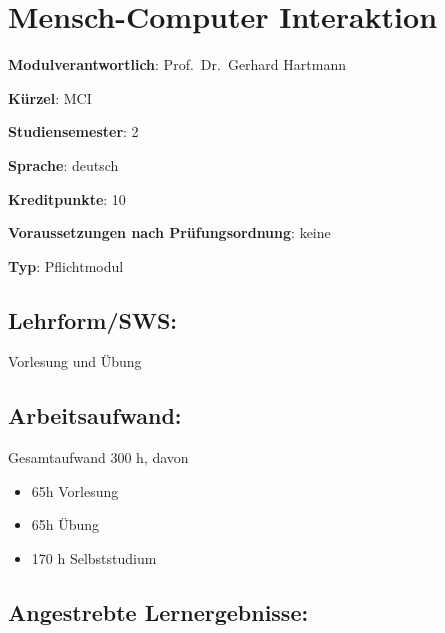 \chapter{Mensch-Computer Interaktion}\label{mensch-computer-interaktion}

\begin{modulHead}
\textbf{Modulverantwortlich}: Prof.~Dr.~Gerhard
Hartmann
\end{modulHead}
\begin{modulHead}
\textbf{Kürzel}:
MCI
\end{modulHead}
\begin{modulHead}
\textbf{Studiensemester}:
2
\end{modulHead}
\begin{modulHead}
\textbf{Sprache}:
deutsch
\end{modulHead}
\begin{modulHead}
\textbf{Kreditpunkte}:
10
\end{modulHead}
\begin{modulHead}
\textbf{Voraussetzungen nach
Prüfungsordnung}: keine
\end{modulHead}
\begin{modulHead}
\textbf{Typ}:
Pflichtmodul
\end{modulHead}


\section*{Lehrform/SWS:}\label{lehrformsws-15}

Vorlesung und Übung

\section*{Arbeitsaufwand:}\label{arbeitsaufwand-14}

Gesamtaufwand 300 h, davon

\begin{itemize}
\tightlist
\item
  65h Vorlesung
\item
  65h Übung
\item
  170 h Selbststudium
\end{itemize}

\section*{Angestrebte
Lernergebnisse:}\label{angestrebte-lernergebnisse-15}

